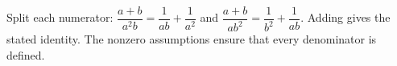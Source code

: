 Split each numerator: $\dfrac{a+b}{a^2b}=\dfrac{1}{ab}+\dfrac{1}{a^2}$ and $\dfrac{a+b}{ab^2}=\dfrac{1}{b^2}+\dfrac{1}{ab}$. Adding gives the stated identity. The nonzero assumptions ensure that every denominator is defined.
